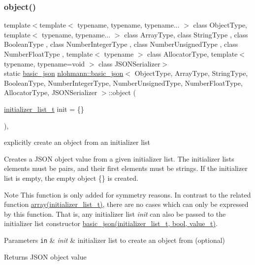 \subsubsection{\texorpdfstring{object()}{object()}}
{\footnotesize\ttfamily template$<$template$<$ typename, typename, typename... $>$ class Object\+Type, template$<$ typename, typename... $>$ class Array\+Type, class String\+Type , class Boolean\+Type , class Number\+Integer\+Type , class Number\+Unsigned\+Type , class Number\+Float\+Type , template$<$ typename $>$ class Allocator\+Type, template$<$ typename, typename=void $>$ class J\+S\+O\+N\+Serializer$>$ \\
static \hyperlink{classnlohmann_1_1basic__json}{basic\+\_\+json} \hyperlink{classnlohmann_1_1basic__json}{nlohmann\+::basic\+\_\+json}$<$ Object\+Type, Array\+Type, String\+Type, Boolean\+Type, Number\+Integer\+Type, Number\+Unsigned\+Type, Number\+Float\+Type, Allocator\+Type, J\+S\+O\+N\+Serializer $>$\+::object (\begin{DoxyParamCaption}\item[{\hyperlink{classnlohmann_1_1basic__json_ad70a098fbc01c53497db29d3b5b656a9}{initializer\+\_\+list\+\_\+t}}]{init = {\ttfamily \{\}} }\end{DoxyParamCaption})\hspace{0.3cm}{\ttfamily [inline]}, {\ttfamily [static]}}



explicitly create an object from an initializer list 

Creates a J\+S\+ON object value from a given initializer list. The initializer lists elements must be pairs, and their first elements must be strings. If the initializer list is empty, the empty object {\ttfamily \{\}} is created.

\begin{DoxyNote}{Note}
This function is only added for symmetry reasons. In contrast to the related function \hyperlink{classnlohmann_1_1basic__json_aa80485befaffcadaa39965494e0b4d2e}{array(initializer\+\_\+list\+\_\+t)}, there are no cases which can only be expressed by this function. That is, any initializer list {\itshape init} can also be passed to the initializer list constructor \hyperlink{classnlohmann_1_1basic__json_ab5dfd9a2b2663b219641cb7fe59b6da2}{basic\+\_\+json(initializer\+\_\+list\+\_\+t, bool, value\+\_\+t)}.
\end{DoxyNote}

\begin{DoxyParams}[1]{Parameters}
\mbox{\tt in}  & {\em init} & initializer list to create an object from (optional)\\
\hline
\end{DoxyParams}
\begin{DoxyReturn}{Returns}
J\+S\+ON object value
\end{DoxyReturn}

